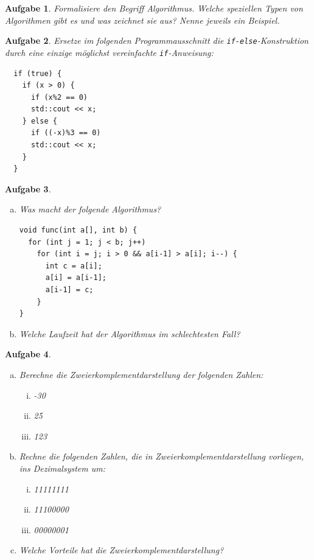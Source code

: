 \documentclass[a4paper,12pt,parskip=full]{scrartcl}
\theoremstyle{exercise}
\newtheorem{exercise}{Aufgabe}
\begin{document}
\begin{exercise}
Formalisiere den Begriff Algorithmus. Welche speziellen
Typen von Algorithmen gibt es und was zeichnet sie aus? Nenne jeweils
ein Beispiel.
\end{exercise}

\begin{exercise}
Ersetze im folgenden Programmausschnitt die
\lstinline{if-else}-Konstruktion durch eine einzige möglichst
vereinfachte \lstinline{if}-Anweisung:
\begin{lstlisting}
  if (true) {
    if (x > 0) {
      if (x%2 == 0)
      std::cout << x;
    } else {
      if ((-x)%3 == 0)
      std::cout << x;
    }
  }
\end{lstlisting}
\end{exercise}

\begin{exercise}
\begin{enumerate}[a)]
\item Was macht der folgende Algorithmus?
\begin{lstlisting}
void func(int a[], int b) {
  for (int j = 1; j < b; j++)
    for (int i = j; i > 0 && a[i-1] > a[i]; i--) {
      int c = a[i];
      a[i] = a[i-1];
      a[i-1] = c;
    }
}
  \end{lstlisting}
\item Welche Laufzeit hat der Algorithmus im schlechtesten Fall?
\end{enumerate}
\end{exercise}

\begin{exercise}
\begin{enumerate}[a)]
\item Berechne die Zweierkomplementdarstellung der folgenden Zahlen:
  \begin{enumerate}[i)]
  \item -30
  \item 25
  \item 123
  \end{enumerate}

\item Rechne die folgenden Zahlen, die in Zweierkomplementdarstellung
  vorliegen, ins Dezimalsystem um:
  \begin{enumerate}[i)]
  \item 11111111
  \item 11100000
  \item 00000001
  \end{enumerate}

\item Welche Vorteile hat die Zweierkomplementdarstellung?
\end{enumerate}
\end{exercise}
\end{document}
